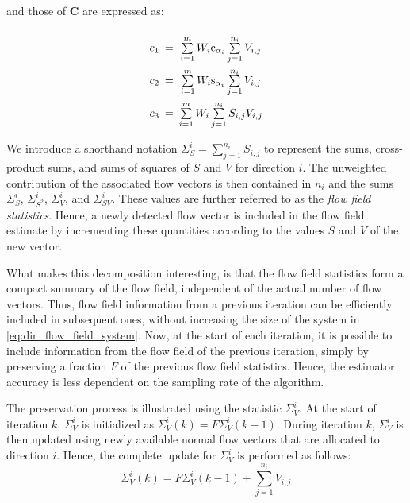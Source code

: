 and those of $\mathbf{C}$ are expressed as:

\begin{equation}
\def\arraystretch{2.2}
\begin{array}{c@{\hspace{0.5em}}c@{\hspace{0.5em}}c@{\hspace{0.5em}}}
{c_1} &=& \sum\limits_{i=1}^m {{W_i}{\rm{c}}_{\alpha _i}\sum\limits_{j=1}^{n_i} {{V_{i,j}}} }\\
{c_2} &=& \sum\limits_{i=1}^m {{W_i}{\rm{s}}_{\alpha _i}\sum\limits_{j=1}^{n_i} {{V_{i,j}}} }\\
{c_3} &=& \sum\limits_{i=1}^m {{W_i}\sum\limits_{j=1}^{n_i} {{S_{i,j}}{V_{i,j}}} } 
\end{array}
\end{equation}

We introduce a shorthand notation $\Sigma_S^i = \sum_{j=1}^{n_i}S_{i,j}$ to represent the sums, cross-product sums, and sums of squares of $S$ and $V$ for direction $i$. The unweighted contribution of the associated flow vectors is then contained in $n_i$ and the sums $\Sigma_S^i$, $\Sigma_{S^2}^i$, $\Sigma_{V}^i$, and $\Sigma_{SV}^i$. These values are further referred to as the \emph{flow field statistics}. Hence, a newly detected flow vector is included in the flow field estimate by incrementing these quantities according to the values $S$ and $V$ of the new vector. 

What makes this decomposition interesting, is that the flow field statistics form a compact summary of the flow field, independent of the actual number of flow vectors. Thus, flow field information from a previous iteration can be efficiently included in subsequent ones, without increasing the size of the system in \cref{eq:dir_flow_field_system}. Now, at the start of each iteration, it is possible to include information from the flow field of the previous iteration, simply by preserving a fraction $F$ of the previous flow field statistics. Hence, the estimator accuracy is less dependent on the sampling rate of the algorithm.

The preservation process is illustrated using the statistic $\Sigma_{V}^i$. At the start of iteration $k$, $\Sigma_{V}^i$ is initialized as $\Sigma_{V}^i(k) = F \Sigma_{V}^i(k-1)$. During iteration $k$, $\Sigma_{V}^i$ is then updated using newly available normal flow vectors that are allocated to direction $i$. Hence, the complete update for $\Sigma_{V}^i$ is performed as follows:
\begin{equation}
\Sigma_{V}^i(k) = F \Sigma_{V}^i(k-1) + \sum_{j=1}^{n_i}{V_{i,j}}
\end{equation}

